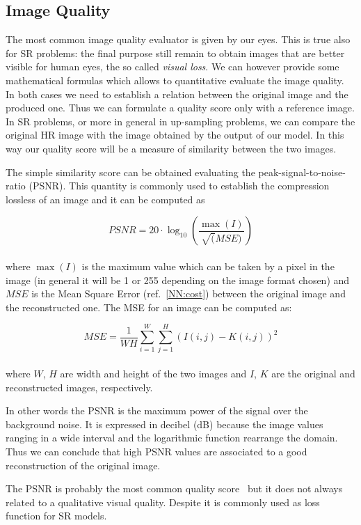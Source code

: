 \documentclass{standalone}
\begin{document}
\subsection[Image Quality]{Image Quality}\label{SR:quality}

The most common image quality evaluator is given by our eyes.
This is true also for SR problems: the final purpose still remain to obtain images that are better visible for human eyes, the so called \emph{visual loss}.
We can however provide some mathematical formulas which allows to quantitative evaluate the image quality.
In both cases we need to establish a relation between the original image and the produced one.
Thus we can formulate a quality score only with a reference image.
In SR problems, or more in general in up-sampling problems, we can compare the original HR image with the image obtained by the output of our model.
In this way our quality score will be a measure of similarity between the two images.

The simple similarity score can be obtained evaluating the peak-signal-to-noise-ratio (PSNR).
This quantity is commonly used to establish the compression lossless of an image and it can be computed as

$$
PSNR = 20 \cdot \log_{10}\left( \frac{\max(I)}{\sqrt(MSE)} \right)
$$
\\
where $\max(I)$ is the maximum value which can be taken by a pixel in the image (in general it will be 1 or 255 depending on the image format chosen) and $MSE$ is the Mean Square Error (ref.~\ref{NN:cost}) between the original image and the reconstructed one.
The MSE for an image can be computed as:

$$
MSE = \frac{1}{WH} \sum_{i=1}^{W}\sum_{j=1}^{H} \left( I(i, j) - K(i, j) \right)^2
$$
\\
where $W$, $H$ are width and height of the two images and $I$, $K$ are the original and reconstructed images, respectively.

In other words the PSNR is the maximum power of the signal over the background noise.
It is expressed in decibel (dB) because the image values ranging in a wide interval and the logarithmic function rearrange the domain.
Thus we can conclude that high PSNR values are associated to a good reconstruction of the original image.

The PSNR is probably the most common quality score~\cite{psnr_ssim} but it does not always related to a qualitative visual quality.
Despite it is commonly used as loss function for SR models.
\end{document}
